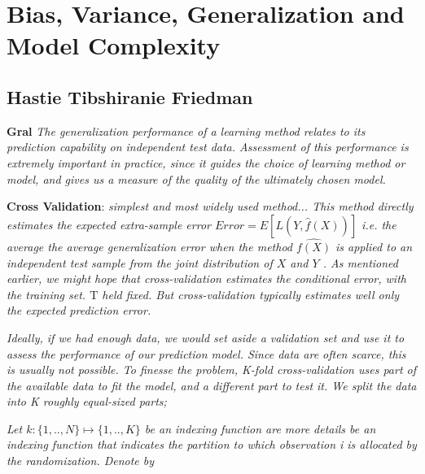 \section{Bias, Variance, Generalization and Model Complexity}

\subsection{Hastie Tibshiranie Friedman}

\textbf{Gral}
\textit{The generalization performance of a learning method relates to its prediction capability on independent test data. Assessment of this performance is extremely important in practice, since it guides the choice of learning method or model, and gives us a measure of the quality of the ultimately chosen model.}

\textbf{Cross Validation}:  
\textit{simplest and most widely used method... This method directly estimates the expected extra-sample error
$Error = E[L(Y,\hat{f}(X))] $ i.e. the average the average generalization error when the method $\hat{f(X)}$ is applied to an independent test sample from the joint distribution of $X$ and $Y$ . As mentioned earlier, we might hope that cross-validation estimates the conditional error, with the training set. $\mathrm{T}$ held fixed. But cross-validation typically estimates well only the expected prediction error.}

\textit{Ideally, if we had enough data, we would set aside a validation set and use it to assess the performance of our prediction model. Since data are often scarce, this is usually not possible. To finesse the problem, K-fold cross-validation uses part of the available data to fit the model, and a different part to test it. We split the data into K roughly equal-sized parts; }

\textit{Let $k : \{1,..,N\} \mapsto \{1, .., K\}$ be an indexing function are more details be an indexing
function that indicates the partition to which observation i is allocated by the randomization. Denote by}


